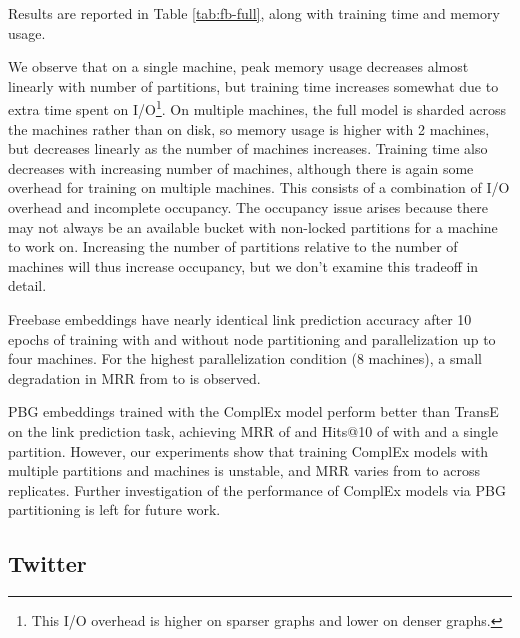 \documentclass{article}
\begin{document}
Results are reported in Table \ref{tab:fb-full}, along with training time and memory usage.

We observe that on a single machine, peak memory usage decreases almost linearly with number of partitions, but training time increases somewhat due to extra time spent on I/O\footnote{This I/O overhead is higher on sparser graphs and lower on denser graphs.}. On multiple machines, the full model is sharded across the machines rather than on disk, so memory usage is higher with 2 machines, but decreases linearly as the number of machines increases. Training time also decreases with increasing number of machines, although there is again some overhead for training on multiple machines. This consists of a combination of I/O overhead and incomplete occupancy. The occupancy issue arises because there may not always be an available bucket with non-locked partitions for a machine to work on. Increasing the number of partitions relative to the number of machines will thus increase occupancy, but we don't examine this tradeoff in detail.

Freebase embeddings have nearly identical link prediction accuracy after 10 epochs of training with and without node partitioning and parallelization up to four machines.  For the highest parallelization condition (8 machines), a small degradation in MRR from  to  is observed.

PBG embeddings trained with the ComplEx model perform better than TransE on the link prediction task, achieving MRR of  and Hits@10 of  with  and a single partition. However, our experiments show that training ComplEx models with multiple partitions and machines is unstable, and MRR varies from  to  across replicates. Further investigation of the performance of ComplEx models via PBG partitioning is left for future work. 









\subsection{Twitter} 
\end{document}
